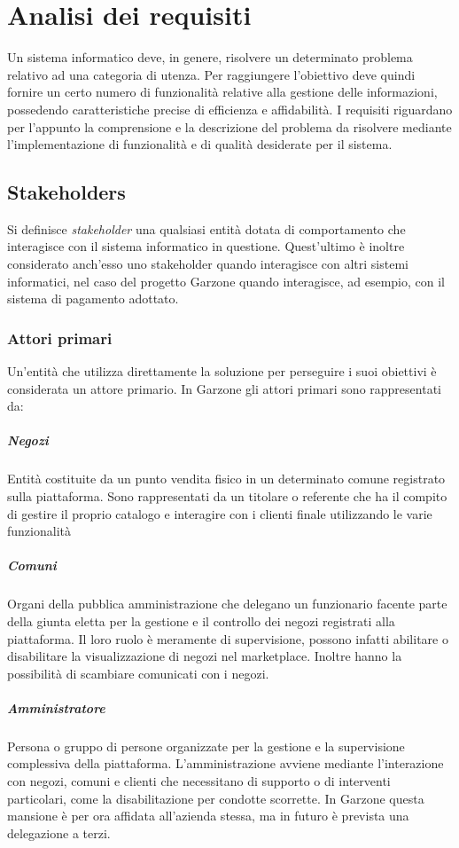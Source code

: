 \chapter{Analisi dei requisiti}
Un sistema informatico deve, in genere, risolvere un determinato problema relativo ad una categoria di utenza. Per raggiungere l'obiettivo deve quindi fornire un certo numero di funzionalità relative alla gestione delle informazioni, possedendo caratteristiche precise di efficienza e affidabilità. I requisiti riguardano per l'appunto la comprensione e la descrizione del problema da risolvere mediante l'implementazione di funzionalità e di qualità desiderate per il sistema.
\section{Stakeholders}
Si definisce \textit{stakeholder} una qualsiasi entità dotata di comportamento che interagisce con il sistema informatico in questione. Quest'ultimo è inoltre considerato anch'esso uno stakeholder quando interagisce con altri sistemi informatici, nel caso del progetto Garzone  quando interagisce, ad esempio, con il sistema di pagamento adottato.
\subsection{Attori primari}
Un'entità che utilizza direttamente la soluzione per perseguire i suoi obiettivi è considerata un attore primario. In Garzone gli attori primari sono rappresentati da:
\paragraph{Negozi} Entità costituite da un punto vendita fisico in un determinato comune registrato sulla piattaforma. Sono rappresentati da un titolare o referente che ha il compito di gestire il proprio catalogo e interagire con i clienti finale utilizzando le varie funzionalità
\paragraph{Comuni} Organi della pubblica amministrazione che delegano un funzionario facente parte della giunta eletta per la gestione e il controllo dei negozi registrati alla piattaforma. Il loro ruolo è meramente di supervisione, possono infatti abilitare o disabilitare la visualizzazione di negozi nel marketplace. Inoltre hanno la possibilità di scambiare comunicati con i negozi.
\paragraph{Amministratore} Persona o gruppo di persone organizzate per la gestione e la supervisione complessiva della piattaforma. L'amministrazione avviene mediante l'interazione con negozi, comuni e clienti che necessitano di supporto o di interventi particolari, come la disabilitazione per condotte scorrette. In Garzone questa mansione è per ora affidata all'azienda stessa, ma in futuro è prevista una delegazione a terzi.
